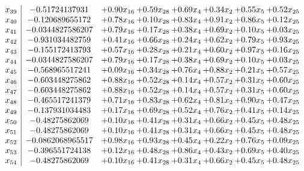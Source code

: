 \documentclass[8pt]{article}
\begin{document}
\[\begin{array}{c| c c@{\hskip 2pt} c@{\hskip 2pt} c@{\hskip 2pt} c@{\hskip 2pt} c@{\hskip 2pt} c@{\hskip 2pt} }
 x_{39}   &  -0.51724137931 & +  0.90 x_{16} & +  0.59 x_{28} & +  0.69 x_{4} & +  0.34 x_{2} & +  0.55 x_{5} & +  0.52 x_{25}\\
 x_{40}   &  -0.120689655172 & +  0.78 x_{16} & +  0.10 x_{28} & +  0.83 x_{4} & +  0.91 x_{2} & +  0.86 x_{5} & +  0.12 x_{25}\\
 x_{41}   &  -0.0344827586207 & +  0.79 x_{16} & +  0.17 x_{28} & +  0.38 x_{4} & +  0.69 x_{2} & +  0.10 x_{5} & +  0.03 x_{25}\\
 x_{42}   &  -0.931034482759 & +  0.41 x_{16} & +  0.66 x_{28} & +  0.24 x_{4} & +  0.62 x_{2} & +  0.79 x_{5} & +  0.93 x_{25}\\
 x_{43}   &  -0.155172413793 & +  0.57 x_{16} & +  0.28 x_{28} & +  0.21 x_{4} & +  0.60 x_{2} & +  0.97 x_{5} & +  0.16 x_{25}\\
 x_{44}   &  -0.0344827586207 & +  0.79 x_{16} & +  0.17 x_{28} & +  0.38 x_{4} & +  0.69 x_{2} & +  0.10 x_{5} & +  0.03 x_{25}\\
 x_{45}   &  -0.568965517241 & +  0.09 x_{16} & +  0.34 x_{28} & +  0.76 x_{4} & +  0.88 x_{2} & +  0.21 x_{5} & +  0.57 x_{25}\\
 x_{46}   &  -0.603448275862 & +  0.88 x_{16} & +  0.52 x_{28} & +  0.14 x_{4} & +  0.57 x_{2} & +  0.31 x_{5} & +  0.60 x_{25}\\
 x_{47}   &  -0.603448275862 & +  0.88 x_{16} & +  0.52 x_{28} & +  0.14 x_{4} & +  0.57 x_{2} & +  0.31 x_{5} & +  0.60 x_{25}\\
 x_{48}   &  -0.465517241379 & +  0.71 x_{16} & +  0.83 x_{28} & +  0.62 x_{4} & +  0.81 x_{2} & +  0.90 x_{5} & +  0.47 x_{25}\\
 x_{49}   &  -0.137931034483 & +  0.17 x_{16} & +  0.69 x_{28} & +  0.52 x_{4} & +  0.76 x_{2} & +  0.41 x_{5} & +  0.14 x_{25}\\
 x_{50}   &  -0.48275862069 & +  0.10 x_{16} & +  0.41 x_{28} & +  0.31 x_{4} & +  0.66 x_{2} & +  0.45 x_{5} & +  0.48 x_{25}\\
 x_{51}   &  -0.48275862069 & +  0.10 x_{16} & +  0.41 x_{28} & +  0.31 x_{4} & +  0.66 x_{2} & +  0.45 x_{5} & +  0.48 x_{25}\\
 x_{52}   &  -0.0862068965517 & +  0.98 x_{16} & +  0.93 x_{28} & +  0.45 x_{4} & +  0.22 x_{2} & +  0.76 x_{5} & +  0.09 x_{25}\\
 x_{53}   &  -0.396551724138 & +  0.12 x_{16} & +  0.48 x_{28} & +  0.86 x_{4} & +  0.43 x_{2} & +  0.69 x_{5} & +  0.40 x_{25}\\
 x_{54}   &  -0.48275862069 & +  0.10 x_{16} & +  0.41 x_{28} & +  0.31 x_{4} & +  0.66 x_{2} & +  0.45 x_{5} & +  0.48 x_{25}\\

\end{array}\]
\end{document}
